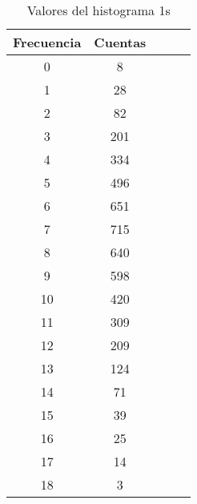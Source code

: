 \begin{center}
\begin{table}[H]
\caption{Valores del histograma 1s}
\label{Tab:histo_1s}
\begin{tabular}{ccccc}
\toprule
Frecuencia & Cuentas \\
\midrule
\num{    0} & \num{    8} \\
\num{    1} & \num{   28} \\
\num{    2} & \num{   82} \\
\num{    3} & \num{  201} \\
\num{    4} & \num{  334} \\
\num{    5} & \num{  496} \\
\num{    6} & \num{  651} \\
\num{    7} & \num{  715} \\
\num{    8} & \num{  640} \\
\num{    9} & \num{  598} \\
\num{   10} & \num{  420} \\
\num{   11} & \num{  309} \\
\num{   12} & \num{  209} \\
\num{   13} & \num{  124} \\
\num{   14} & \num{   71} \\
\num{   15} & \num{   39} \\
\num{   16} & \num{   25} \\
\num{   17} & \num{   14} \\
\num{   18} & \num{    3} \\
\bottomrule
\end{tabular}
\end{table}
\end{center}
